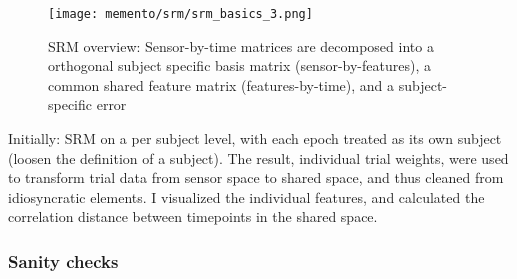 \begin{figure}
	\centering
	\texttt{[image: memento/srm/srm\_basics\_3.png]}
	\caption[SRM overview]{SRM overview: Sensor-by-time matrices are decomposed into a orthogonal subject specific basis matrix (sensor-by-features), a common shared feature matrix (features-by-time), and a subject-specific error}
	\label{fig:srm-basics-multi}
\end{figure}




Initially: SRM on a per subject level, with each epoch treated as its own subject (loosen the definition of a subject). The result, individual trial weights, were used to transform trial data from sensor space to shared space, and thus cleaned from idiosyncratic elements.
I visualized the individual features, and calculated the correlation distance between timepoints in the shared space.


\subsubsection{Sanity checks}


